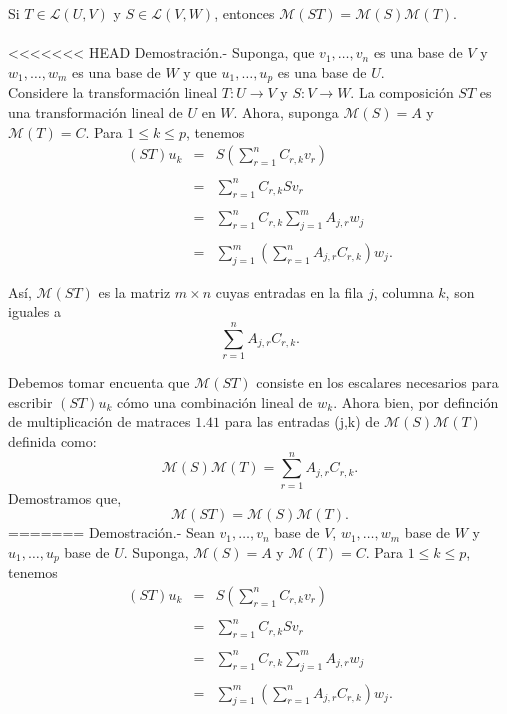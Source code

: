 \setcounter{myteo}{42}
\begin{myteo}\;\\\\
    Si $T\in \mathcal{L}(U,V)$ y $S\in \mathcal{L}(V,W)$, entonces $\mathcal{M}(ST)=\mathcal{M}(S)\mathcal{M}(T)$.\\\\
<<<<<<< HEAD
	Demostración.-\; Suponga, que $v_1,\ldots,v_n$ es una base de $V$ y $w_1,\ldots,w_m$ es una base de $W$ y que $u_1,\ldots,u_p$ es una base de $U$.\\
	Considere la transformación lineal $T: U\to V$ y $S: V\to W$. La composición $ST$ es una transformación lineal de $U$ en $W$. Ahora, suponga $\mathcal{M}(S)=A$ y $\mathcal{M}(T)=C$. Para $1\leq k\leq p$, tenemos
$$
\begin{array}{rcl}
    (ST)u_k &=& \displaystyle S\left(\sum_{r=1}^n C_{r,k}v_r\right)\\\\
	    &=& \displaystyle \sum_{r=1}^n C_{r,k}Sv_r\\\\
	    &=& \displaystyle\sum_{r=1}^n C_{r,k}\sum_{j=1}^m A_{j,r}w_j\\\\
	    &=& \displaystyle\sum_{j=1}^m\left(\sum_{r=1}^n A_{j,r}C_{r,k}\right)w_j.
\end{array}
$$	

Así, $\mathcal{M}(ST)$ es la matriz $m\times n$ cuyas entradas en la fila $j$, columna $k$, son iguales a
$$\sum_{r=1}^n A_{j,r}C_{r,k}.$$

Debemos tomar encuenta que $\mathcal{M}(ST)$ consiste en los escalares necesarios para escribir $(ST)u_k$ cómo una combinación lineal de $w_k$. Ahora bien, por definción de multiplicación de matraces $1.41$ para las entradas (j,k) de $\mathcal{M}(S)\mathcal{M}(T)$ definida como:
$$\mathcal{M}(S)\mathcal{M}(T)=\sum_{r=1}^n A_{j,r}C_{r,k}.$$
Demostramos que,
$$\mathcal{M}(ST)=\mathcal{M}(S)\mathcal{M}(T).$$
=======
	Demostración.-\; Sean $v_1,\ldots,v_n$ base de $V$, $w_1,\ldots,w_m$ base de $W$ y $u_1,\ldots,u_p$ base de $U$. Suponga, $\mathcal{M}(S)=A$ y $\mathcal{M}(T)=C$. Para $1\leq k\leq p$, tenemos
	$$
	\begin{array}{rcl}
	    (ST)u_k &=& \displaystyle S\left(\sum_{r=1}^n C_{r,k}v_r\right)\\\\
		    &=& \displaystyle \sum_{r=1}^n C_{r,k}Sv_r\\\\
		    &=& \displaystyle\sum_{r=1}^n C_{r,k}\sum_{j=1}^m A_{j,r}w_j\\\\
		    &=& \displaystyle\sum_{j=1}^m\left(\sum_{r=1}^n A_{j,r}C_{r,k}\right)w_j.
	\end{array}
	$$	


\end{myteo}
